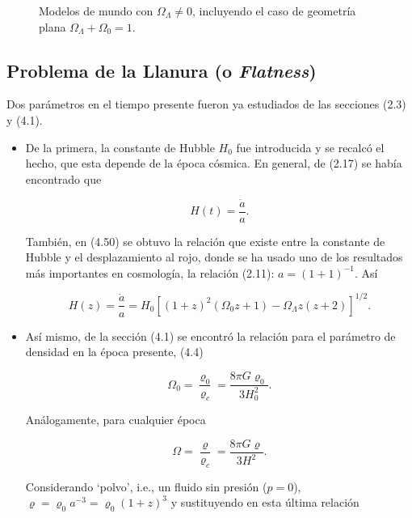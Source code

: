 \documentclass[11pt]{article}
\begin{document}
{\begin{figure}[H]
\begin{minipage}[b]{0.36\linewidth}
            \caption{\footnotesize{Modelos de mundo con $\Omega_{\Lambda} \neq 0$, incluyendo el caso de geometría plana $\Omega_{\Lambda} + \Omega_0 =1$. }}
    \end{minipage}
\end{figure}
    
    
    \subsection{Problema de la Llanura (o {\textit{Flatness}})}
    
    Dos parámetros en el tiempo presente fueron ya estudiados de las secciones (2.3) y (4.1). 

\begin{itemize}

	\item De la primera, la constante de Hubble $H_0$ fue introducida y se recalcó el hecho, que esta depende de la época cósmica. En general, de (2.17)  se había encontrado que

\begin{equation}
H(t) = \frac{\dot{a}}{a}.
\end{equation} 

También, en (4.50) se obtuvo la relación que existe entre la constante de Hubble y el desplazamiento al rojo, donde se ha usado uno de los resultados más importantes en cosmología, la relación (2.11): $a = (1 + 1)^{-1}$. Así

\begin{equation}
H(z) = \frac{\dot{a}}{a} = H_0 [(1+z)^2 (\Omega_0 z +1) - \Omega_{\Lambda}z(z+2)]^{1/2}.
\end{equation} 

\item Así mismo, de la sección (4.1) se encontró la relación para el parámetro de densidad en la época presente, (4.4)

\begin{equation}
\Omega_0 = \frac{\varrho_0}{\varrho_c} = \frac{8 \pi G \varrho_0}{3 H_0^2}.
\end{equation}

Análogamente, para cualquier época

    \begin{equation}
        \Omega = \frac{\varrho}{\varrho_c} = \frac{8 \pi G \varrho}{3 H^2}.
    \end{equation}

    Considerando `polvo’, i.e., un fluido sin presión ($p=0$),  $\varrho = \varrho_0 a^{-3} = \varrho_0(1+z)^3 $ y sustituyendo en esta última relación


\end{itemize}}
\end{document}
